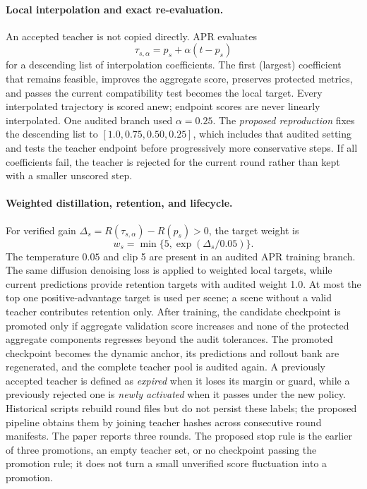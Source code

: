 \paragraph{Local interpolation and exact re-evaluation.}
An accepted teacher is not copied directly.  APR evaluates
\begin{equation}
 \tau_{s,\alpha}=p_s+\alpha(t-p_s)
\end{equation}
for a descending list of interpolation coefficients.  The first (largest)
coefficient that remains feasible, improves the aggregate score, preserves
protected metrics, and passes the current compatibility test becomes the local
target.  Every interpolated trajectory is scored anew; endpoint scores are
never linearly interpolated.  One audited branch used $\alpha=0.25$.  The
\emph{proposed reproduction} fixes the descending list to
$[1.0,0.75,0.50,0.25]$, which includes that audited setting and tests the
teacher endpoint before progressively more conservative steps.  If all
coefficients fail, the teacher is
rejected for the current round rather than kept with a smaller unscored step.

\paragraph{Weighted distillation, retention, and lifecycle.}
For verified gain $\Delta_s=R(\tau_{s,\alpha})-R(p_s)>0$, the target weight is
\begin{equation}
 w_s=\min\{5,\exp(\Delta_s/0.05)\}.
\end{equation}
The temperature $0.05$ and clip 5 are present in an audited APR training
branch.  The same diffusion denoising loss is applied to weighted local
targets, while current predictions provide retention targets with audited
weight 1.0.  At most the top one positive-advantage target is used per scene; a
scene without a valid teacher contributes retention only.  After training, the
candidate checkpoint is promoted only if aggregate validation score increases
and none of the protected aggregate components regresses beyond the audit
tolerances.  The promoted checkpoint becomes the dynamic anchor, its
predictions and rollout bank are regenerated, and the complete teacher pool is
audited again.  A previously accepted teacher is defined as \emph{expired} when
it loses its margin or guard, while a previously rejected one is \emph{newly
activated} when it passes under the new policy.  Historical scripts rebuild
round files but do not persist these labels; the proposed pipeline obtains them
by joining teacher hashes across consecutive round manifests.  The paper reports three
rounds.  The proposed stop rule is the earlier of three promotions, an empty
teacher set, or no checkpoint passing the promotion rule; it does not turn a
small unverified score fluctuation into a promotion.

